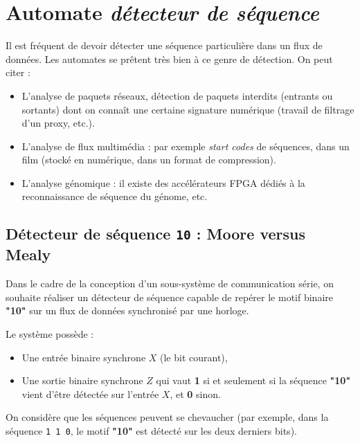 \documentclass[a4paper,11pt]{article}
\begin{document}
\section{Automate \textit{détecteur de séquence}}

Il est fréquent de devoir détecter une séquence particulière dans un flux de données. Les automates se prêtent très bien à ce genre de détection. On peut citer :
\begin{itemize}
    \item L'analyse de paquets réseaux, détection de paquets interdits (entrants ou sortants) dont on connaît une certaine signature numérique (travail de filtrage d'un proxy, etc.).
    \item L'analyse de flux multimédia : par exemple \textit{start codes} de séquences, dans un film (stocké en numérique, dans un format de compression).
    \item L'analyse génomique : il existe des accélérateurs FPGA dédiés à la reconnaissance de séquence du génome, etc.
\end{itemize}

\subsection{Détecteur de séquence \texttt{10} : Moore versus Mealy}
Dans le cadre de la conception d'un sous-système de communication série, on souhaite réaliser un détecteur de séquence capable de repérer le motif binaire \textbf{"10"} sur un flux de données synchronisé par une horloge.

Le système possède :
\begin{itemize}
    \item Une entrée binaire synchrone $X$ (le bit courant),
    \item Une sortie binaire synchrone $Z$ qui vaut \textbf{1} si et seulement si la séquence \textbf{"10"} vient d'être détectée sur l'entrée $X$, et \textbf{0} sinon.
\end{itemize}

On considère que les séquences peuvent se chevaucher (par exemple, dans la séquence \texttt{1\,1\,0}, le motif \textbf{"10"} est détecté sur les deux derniers bits).

\end{document}
